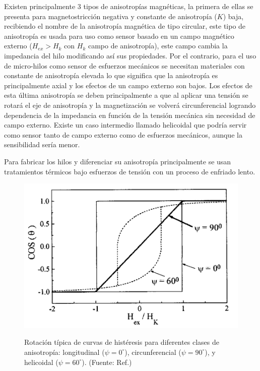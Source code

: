 \documentclass[12pt,letterpaper]{article}
\numberwithin{equation}{section}
\begin{document}
Existen principalmente 3 tipos de anisotropías magnéticas, la primera de ellas se presenta para magnetostricción negativa y constante de anisotropía ($K$) baja, recibiendo el nombre de la anisotropía magnética de tipo circular, este tipo de anisotropía es usada para uso como sensor basado en un campo magnético externo ($H_{ex}>H_k$ con $H_k$ campo de anisotropía), este campo cambia la impedancia del hilo modificando así sus propiedades. Por el contrario, para el uso de micro-hilos como sensor de esfuerzos mecánicos se necesitan materiales con constante de anisotropía elevada lo que significa que la anisotropía es principalmente axial y los efectos de un campo externo son bajos. Los efectos de esta última anisotropía se deben principalmente a que al aplicar una tensión se rotará el eje de anisotropía y la magnetización se volverá circunferencial logrando dependencia de la impedancia en función de la tensión mecánica sin necesidad de campo externo. Existe un caso intermedio llamado helicoidal que podría servir como sensor tanto de campo externo como de esfuerzos mecánicos, aunque la sensibilidad sería menor.

Para fabricar los hilos y diferenciar su anisotropía principalmente se usan tratamientos térmicos bajo esfuerzos de tensión con un proceso de enfriado lento.
\begin{figure}[H]
	\centering\includegraphics[scale=0.4]{Imagenes/Rot_hysteresis.png}\\
	\caption{Rotación típica de curvas de histéresis para diferentes clases de anisotropía: longitudinal ($\psi=0^\circ$), circunferencial ($\psi=90^\circ$), y helicoidal ($\psi=60^\circ$). (Fuente: Ref.\cite{Wire_theory_1})}
	\label{fig:Rot_hysteresis}
\end{figure} 
\end{document}
